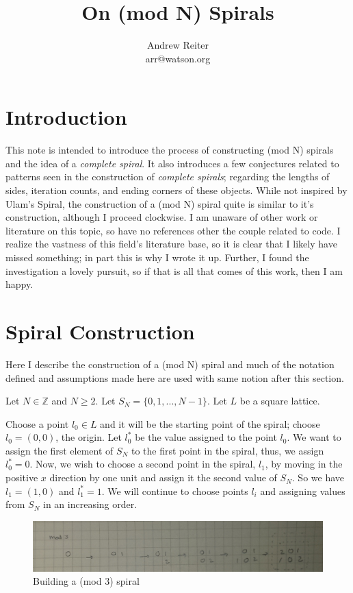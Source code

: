 \documentclass[11pt]{amsart}
\title{On (mod N) Spirals}
\author{Andrew Reiter\\
arr@watson.org}
\theoremstyle{mydef}
\begin{document}
\maketitle
\section{Introduction}
This note is intended to introduce the process of constructing (mod N) spirals and the idea of a \textit{complete spiral}.  It also introduces a few conjectures related to patterns seen in the construction of \textit{complete spirals}; regarding the lengths of sides, iteration counts, and ending corners of these objects. While not inspired by Ulam's Spiral, the construction of  a (mod N) spiral quite is similar to it's construction, although I proceed clockwise. I am unaware of other work or literature on this topic, so have no references other the couple related to code. I realize the vastness of this field's literature base, so it is clear that I likely have missed something; in part this is why I wrote it up. Further, I found the investigation a lovely pursuit, so if that is all that comes of this work, then I am happy.

\section{Spiral Construction}
Here I describe the construction of a (mod N) spiral and much of the notation defined and assumptions made here are used with same notion after this section.

Let $N \in \mathbb{Z}$ and $N \ge 2$. Let $S_N = \{ 0, 1, ..., N-1 \}$. Let $L$ be a square lattice. 

Choose a point $l_0 \in L$ and it will be the starting point of the spiral; choose $l_0 = (0, 0)$, the origin. Let $l^*_0$ be the value assigned to the point $l_0$. We want to assign the first element of $S_N$ to the first point in the spiral, thus, we assign $l^*_0 = 0$. Now, we wish to choose a second point in the spiral, $l_1$, by moving in the positive $x$ direction by one unit and assign it the second value of $S_N$. So we have $l_1 = (1, 0)$ and $l^*_1 = 1$.  We will continue to choose points $l_i$ and assigning values from $S_N$ in an increasing order.

\begin{figure}[h]
\centering
\includegraphics[scale=0.3]{mod3basic.png}
\caption{Building a (mod 3) spiral}
\label{fig:mod3spiral}
\end{figure}
\end{document}
